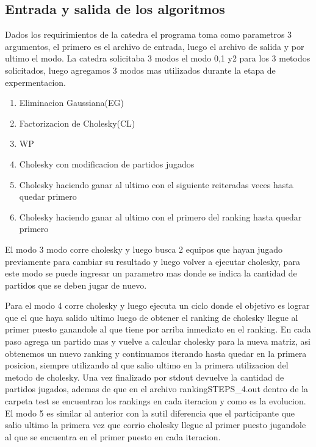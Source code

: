 \subsection{Entrada y salida de los algoritmos}

Dados los requirimientos de la catedra el programa toma como parametros 3 argumentos, el primero es el archivo de entrada, luego el archivo de salida y
por ultimo el modo.  La catedra solicitaba 3 modos el modo 0,1 y2 para los 3 metodos solicitados, luego agregamos 3 modos mas utilizados durante la etapa de expermentacion.

\begin{enumerate}
    \item Eliminacion Gaussiana(EG)
    \item Factorizacion de Cholesky(CL)
    \item WP
    \item Cholesky con modificacion de partidos jugados
    \item Cholesky haciendo ganar al ultimo con el siguiente reiteradas veces hasta quedar primero
    \item Cholesky haciendo ganar al ultimo con el primero del ranking hasta quedar primero
\end{enumerate}

El modo 3 modo corre cholesky y luego busca 2 equipos que hayan jugado previamente para cambiar su resultado y luego volver a ejecutar cholesky,
para este modo se puede ingresar un parametro mas donde se indica la cantidad de partidos que se deben jugar de nuevo.

Para el modo 4 corre cholesky y luego ejecuta un ciclo donde el objetivo es lograr que el que haya salido ultimo luego de obtener el ranking de cholesky llegue al primer puesto ganandole
al que tiene por arriba inmediato en el ranking. En cada paso agrega un partido mas y vuelve a calcular cholesky para la nueva matriz, asi obtenemos un nuevo ranking y continuamos iterando hasta quedar en la primera posicion, siempre utilizando al que salio ultimo en la primera utilizacion del metodo de cholesky.
Una vez finalizado por stdout devuelve la cantidad de partidos jugados, ademas de que en el archivo  rankingSTEPS_4.out dentro de la carpeta test se encuentran los rankings en cada iteracion y como es la evolucion.
El modo 5 es similar al anterior con la sutil diferencia que el participante que salio ultimo la primera vez que corrio cholesky llegue al primer puesto jugandole al que se encuentra en el primer puesto en cada iteracion.


